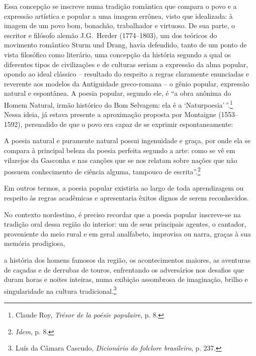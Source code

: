 \noindent Essa concepção se inscreve numa
tradição romântica que compara o povo e a expressão artística e popular a uma
imagem errônea, visto que idealizada: à imagem de um povo bom, bonachão,
trabalhador e virtuoso. De sua parte, o escritor e filósofo alemão J.G.~Herder
(1774--1803), um dos teóricos do movimento romântico Sturm und Drang, havia
defendido, tanto de um ponto de vista filosófico como literário, uma concepção
da história segundo a qual os diferentes tipos de civilizações e de culturas
seriam a expressão da alma popular, opondo ao ideal clássico -- resultado do
respeito a regras claramente enunciadas e reverente aos modelos da Antiguidade
greco-romana -- o gênio popular, expressão natural e espontânea. A poesia
popular, segundo ele, é “a obra anônima do Homem Natural, irmão histórico do Bom
Selvagem: ela é a ‘Naturpoesia’\,”.\footnote{ Claude Roy, \textit{Trésor de la
poésie populaire}, p. 8.} Nessa ideia, já estava presente a aproximação
proposta por Montaigne (1553--1592), persuadido de que o povo era capaz de se
exprimir espontaneamente:

\begin{hedraquote}
A poesia natural e puramente natural possui
ingenuidade e graça, por onde ela se compara à principal beleza da poesia
perfeita segundo a arte: como se vê em vilarejos da Gasconha e nas canções que
se nos relatam sobre nações que não possuem conhecimento de ciência alguma,
tampouco de escrita”.\footnote{ \textit{Idem}, p. 8.}
\end{hedraquote}

Em outros termos, a poesia popular existiria ao largo de toda aprendizagem ou
respeito às regras acadêmicas e apresentaria êxitos dignos de serem
reconhecidos.

No contexto nordestino, é preciso recordar que a poesia popular inscreve-se na
tradição oral dessa região do interior: um de seus principais agentes, o
cantador, proveniente do meio rural e em geral analfabeto, improvisa ou narra,
graças à sua memória prodigiosa, 

\begin{hedraquote}
a história dos homens famosos da região, os
acontecimentos maiores, as aventuras de caçadas e de derrubas de touros,
enfrentando os adversários nos desafios que duram horas e noites inteiras, numa
exibição assombrosa de imaginação, brilho e singularidade na cultura
tradicional.\footnote{ Luís da Câmara Cascudo, \textit{Dicionário do folclore
brasileiro}, p. 237.}
\end{hedraquote}

